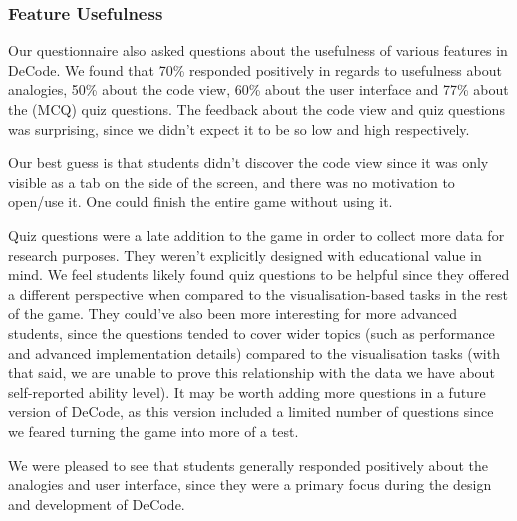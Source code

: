 \documentclass[10pt]{article}
\begin{document}
\subsubsection{Feature Usefulness}
Our questionnaire also asked questions about the usefulness of various features in DeCode. We found that 70\% responded positively in regards to usefulness about analogies, 50\% about the code view, 60\% about the user interface and 77\% about the (MCQ) quiz questions. The feedback about the code view and quiz questions was surprising, since we didn't expect it to be so low and high respectively.\par
Our best guess is that students didn't discover the code view since it was only visible as a tab on the side of the screen, and there was no motivation to open/use it. One could finish the entire game without using it.\par
Quiz questions were a late addition to the game in order to collect more data for research purposes. They weren't explicitly designed with educational value in mind. We feel students likely found quiz questions to be helpful since they offered a different perspective when compared to the visualisation-based tasks in the rest of the game. They could've also been more interesting for more advanced students, since the questions tended to cover wider topics (such as performance and advanced implementation details) compared to the visualisation tasks (with that said, we are unable to prove this relationship with the data we have about self-reported ability level). It may be worth adding more questions in a future version of DeCode, as this version included a limited number of questions since we feared turning the game into more of a test.\par
We were pleased to see that students generally responded positively about the analogies and user interface, since they were a primary focus during the design and development of DeCode.
\end{document}
